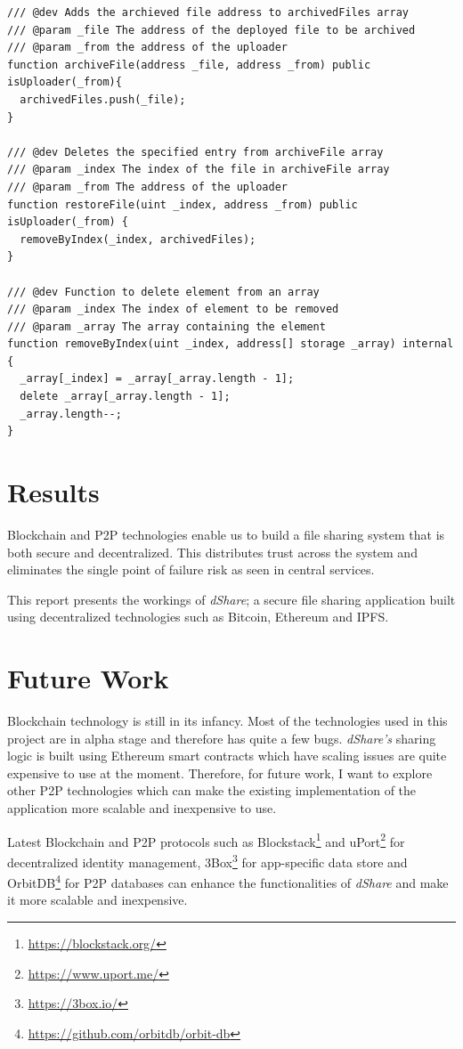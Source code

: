 \documentclass[]{article}
\begin{document}
\begin{verbatim}
/// @dev Adds the archieved file address to archivedFiles array
/// @param _file The address of the deployed file to be archived
/// @param _from the address of the uploader
function archiveFile(address _file, address _from) public isUploader(_from){
  archivedFiles.push(_file);
}

/// @dev Deletes the specified entry from archiveFile array
/// @param _index The index of the file in archiveFile array
/// @param _from The address of the uploader
function restoreFile(uint _index, address _from) public isUploader(_from) {
  removeByIndex(_index, archivedFiles);
}

/// @dev Function to delete element from an array
/// @param _index The index of element to be removed
/// @param _array The array containing the element
function removeByIndex(uint _index, address[] storage _array) internal {
  _array[_index] = _array[_array.length - 1];
  delete _array[_array.length - 1];
  _array.length--;
}
\end{verbatim}
	
	\newpage
	\section{Results}
		Blockchain and P2P technologies enable us to build a file sharing system that is both secure and decentralized. This distributes trust across the system and eliminates the single point of failure risk as seen in central services.
		
		This report presents the workings of \textit{dShare}; a secure file sharing application built using decentralized technologies such as Bitcoin, Ethereum and IPFS.
	
	\newpage
	\section{Future Work}
		Blockchain technology is still in its infancy. Most of the technologies used in this project are in alpha stage and therefore has quite a few bugs. \textit{dShare's} sharing logic is built using Ethereum smart contracts which have scaling issues are quite expensive to use at the moment. Therefore, for future work, I want to explore other P2P technologies which can make the existing implementation of the application more scalable and inexpensive to use.
		
		Latest Blockchain and P2P protocols such as Blockstack\footnote{\url{https://blockstack.org/}} and uPort\footnote{\url{https://www.uport.me/}} for decentralized identity management, 3Box\footnote{\url{https://3box.io/}} for app-specific data store and OrbitDB\footnote{\url{https://github.com/orbitdb/orbit-db}} for P2P databases can enhance the functionalities of \textit{dShare} and make it more scalable and inexpensive.
	
	\newpage
	
	
\end{document}
